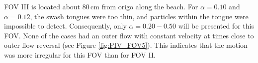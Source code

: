 \documentclass[review, authoryear]{elsarticle}
\newcommand{\cm}{\,\mbox{cm}}
\begin{document}
 FOV III is located about $80\cm$ from origo along the beach. For $\alpha=0.10$ and $\alpha=0.12$, the swash tongues were too thin, and particles within the tongue were impossible to detect. Consequently, only $\alpha=0.20-0.50$ will be presented for this FOV. None of the cases had an outer flow with constant velocity at times close to outer flow reversal (see Figure \ref{fig:PIV_FOV5}). This indicates that the motion was more irregular for this FOV than for FOV II.
 \begin{figure}[]
\centering
{}
\end{figure}
\end{document}
